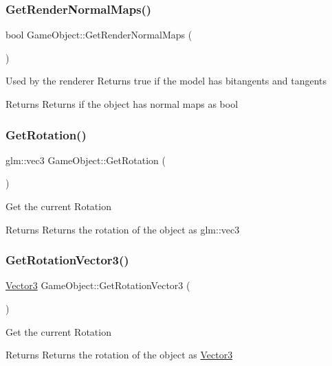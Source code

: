 \subsubsection{\texorpdfstring{GetRenderNormalMaps()}{GetRenderNormalMaps()}}
{\footnotesize\ttfamily bool Game\+Object\+::\+Get\+Render\+Normal\+Maps (\begin{DoxyParamCaption}{ }\end{DoxyParamCaption})}

Used by the renderer Returns true if the model has bitangents and tangents \begin{DoxyReturn}{Returns}
Returns if the object has normal maps as bool 
\end{DoxyReturn}
\mbox{\label{class_game_object_ac37ee5e22d3f9a0dc1ddb3ad8f5aea0e}} 
\subsubsection{\texorpdfstring{GetRotation()}{GetRotation()}}
{\footnotesize\ttfamily glm\+::vec3 Game\+Object\+::\+Get\+Rotation (\begin{DoxyParamCaption}{ }\end{DoxyParamCaption})}

Get the current Rotation \begin{DoxyReturn}{Returns}
Returns the rotation of the object as glm\+::vec3 
\end{DoxyReturn}
\mbox{\label{class_game_object_a271ece7ce9dcac2d1076754c96049dd0}} 
\subsubsection{\texorpdfstring{GetRotationVector3()}{GetRotationVector3()}}
{\footnotesize\ttfamily \mbox{\hyperlink{struct_vector3}{Vector3}} Game\+Object\+::\+Get\+Rotation\+Vector3 (\begin{DoxyParamCaption}{ }\end{DoxyParamCaption})}

Get the current Rotation \begin{DoxyReturn}{Returns}
Returns the rotation of the object as \mbox{\hyperlink{struct_vector3}{Vector3}} 
\end{DoxyReturn}
\mbox{\label{class_game_object_aac0681f3ee0d74b8d295df8fc53aeb52}} 
